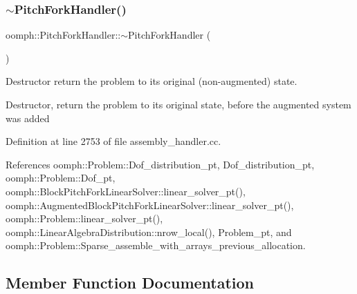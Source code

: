 \mbox{\label{classoomph_1_1PitchForkHandler_a69c6b0b6aedd03d828d295531fd61820}} 
\subsubsection{\texorpdfstring{$\sim$\+Pitch\+Fork\+Handler()}{~PitchForkHandler()}}
{\footnotesize\ttfamily oomph\+::\+Pitch\+Fork\+Handler\+::$\sim$\+Pitch\+Fork\+Handler (\begin{DoxyParamCaption}{ }\end{DoxyParamCaption})}



Destructor return the problem to its original (non-\/augmented) state. 

Destructor, return the problem to its original state, before the augmented system was added 

Definition at line 2753 of file assembly\+\_\+handler.\+cc.



References oomph\+::\+Problem\+::\+Dof\+\_\+distribution\+\_\+pt, Dof\+\_\+distribution\+\_\+pt, oomph\+::\+Problem\+::\+Dof\+\_\+pt, oomph\+::\+Block\+Pitch\+Fork\+Linear\+Solver\+::linear\+\_\+solver\+\_\+pt(), oomph\+::\+Augmented\+Block\+Pitch\+Fork\+Linear\+Solver\+::linear\+\_\+solver\+\_\+pt(), oomph\+::\+Problem\+::linear\+\_\+solver\+\_\+pt(), oomph\+::\+Linear\+Algebra\+Distribution\+::nrow\+\_\+local(), Problem\+\_\+pt, and oomph\+::\+Problem\+::\+Sparse\+\_\+assemble\+\_\+with\+\_\+arrays\+\_\+previous\+\_\+allocation.



\subsection{Member Function Documentation}
\mbox{\label{classoomph_1_1PitchForkHandler_a7363cb34d716d64d891af5018e09d807}} 
